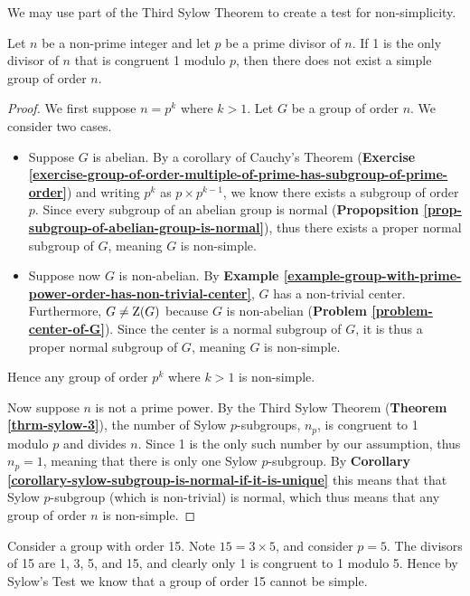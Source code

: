 We may use part of the Third Sylow Theorem to create a test for non-simplicity.
\begin{theorem}
    Let $n$ be a non-prime integer and let $p$ be a prime divisor of $n$. If 1 is the only divisor of $n$ that is congruent 1 modulo $p$, then there does not exist a simple group of order $n$.
\end{theorem}
\begin{proof}
    We first suppose $n = p^k$ where $k > 1$. Let $G$ be a group of order $n$. We consider two cases.
    \begin{itemize}
        \item Suppose $G$ is abelian. By a corollary of Cauchy's Theorem (\textbf{Exercise \ref{exercise-group-of-order-multiple-of-prime-has-subgroup-of-prime-order}}) and writing $p^k$ as $p \times p^{k-1}$, we know there exists a subgroup of order $p$. Since every subgroup of an abelian group is normal (\textbf{Propopsition \ref{prop-subgroup-of-abelian-group-is-normal}}), thus there exists a proper normal subgroup of $G$, meaning $G$ is non-simple.
        \item Suppose now $G$ is non-abelian. By \textbf{Example \ref{example-group-with-prime-power-order-has-non-trivial-center}}, $G$ has a non-trivial center. Furthermore, $G \neq \mathrm{Z}(G)$ because $G$ is non-abelian (\textbf{Problem \ref{problem-center-of-G}}). Since the center is a normal subgroup of $G$, it is thus a proper normal subgroup of $G$, meaning $G$ is non-simple.
    \end{itemize}
    Hence any group of order $p^k$ where $k > 1$ is non-simple.

    Now suppose $n$ is not a prime power. By the Third Sylow Theorem (\textbf{Theorem \ref{thrm-sylow-3}}), the number of Sylow $p$-subgroups, $n_p$, is congruent to 1 modulo $p$ and divides $n$. Since 1 is the only such number by our assumption, thus $n_p = 1$, meaning that there is only one Sylow $p$-subgroup. By \textbf{Corollary \ref{corollary-sylow-subgroup-is-normal-if-it-is-unique}} this means that that Sylow $p$-subgroup (which is non-trivial) is normal, which thus means that any group of order $n$ is non-simple.
\end{proof}
\begin{example}
    Consider a group with order 15. Note $15 = 3 \times 5$, and consider $p = 5$. The divisors of 15 are 1, 3, 5, and 15, and clearly only 1 is congruent to 1 modulo 5. Hence by Sylow's Test we know that a group of order 15 cannot be simple.
\end{example}

